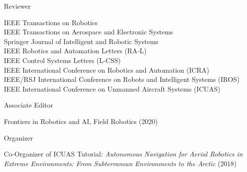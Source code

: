 

\begin{cvskills}

  \cvskill
    {Reviewer} %
    {\begin{minipage}[t]{\linewidth}\baselineskip
    		IEEE Transactions on Robotics \\
    		IEEE Transactions on Aerospace and Electronic Systems \\
    		Springer Journal of Intelligent and Robotic Systems \\
    		IEEE Robotics and Automation Letters (RA-L) \\
    		IEEE Control Systems Letters (L-CSS) \\
 		IEEE International Conference on Robotics and Automation (ICRA) \\
 		IEEE/RSJ International Conference on Robots and Intelligent Systems (IROS) \\
 		IEEE International Conference on Unmanned Aircraft Systems (ICUAS) \end{minipage}}
 \cvskill
    {Associate Editor} %
    {\begin{minipage}[t]{\linewidth}\baselineskip
    		Frontiers in Robotics and AI, Field Robotics (2020)\end{minipage}}
 \cvskill
 	{Organizer} %
    {\begin{minipage}[t]{\linewidth}\baselineskip
    		Co-Organizer of ICUAS Tutorial: \emph{Autonomous Navigation for Aerial Robotics in Extreme Environments: From Subterranean Environments to the Arctic} (2018)\end{minipage}}

\end{cvskills}

